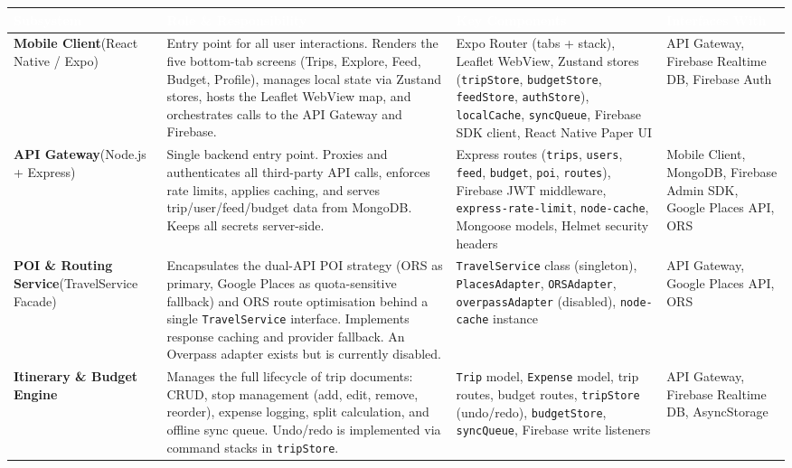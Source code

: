 \documentclass[12pt, a4paper]{article}
\newcommand{\thcell}[1]{\textcolor{white}{\textbf{\small #1}}}
\begin{document}
\begin{longtable}{L{3.0cm} L{4.8cm} L{3.8cm} L{2.2cm}}
\toprule
{}
\thcell{Subsystem} & \thcell{Role \& Responsibility} &
\thcell{Key Components} & \thcell{Interfaces With} \\
\midrule
\endhead
\bottomrule
\endfoot

\textbf{Mobile Client}\newline(React Native / Expo) &
Entry point for all user interactions. Renders the five bottom-tab screens (Trips, Explore, Feed, Budget, Profile), manages local state via Zustand stores, hosts the Leaflet WebView map, and orchestrates calls to the API Gateway and Firebase. &
Expo Router (tabs + stack), Leaflet WebView, Zustand stores (\texttt{tripStore}, \texttt{budgetStore}, \texttt{feedStore}, \texttt{authStore}), \texttt{localCache}, \texttt{syncQueue}, Firebase SDK client, React Native Paper UI &
API Gateway, Firebase Realtime DB, Firebase Auth \\

\textbf{API Gateway}\newline(Node.js + Express) &
Single backend entry point. Proxies and authenticates all third-party API calls, enforces rate limits, applies caching, and serves trip/user/feed/budget data from MongoDB. Keeps all secrets server-side. &
Express routes (\texttt{trips}, \texttt{users}, \texttt{feed}, \texttt{budget}, \texttt{poi}, \texttt{routes}), Firebase JWT middleware, \texttt{express-rate-limit}, \texttt{node-cache}, Mongoose models, Helmet security headers &
Mobile Client, MongoDB, Firebase Admin SDK, Google Places API, ORS \\

\textbf{POI \& Routing Service}\newline(TravelService Facade) &
Encapsulates the dual-API POI strategy (ORS as primary, Google Places as quota-sensitive fallback) and ORS route optimisation behind a single \texttt{TravelService} interface. Implements response caching and provider fallback. An Overpass adapter exists but is currently disabled. &
\texttt{TravelService} class (singleton), \texttt{PlacesAdapter}, \texttt{ORSAdapter}, \texttt{overpassAdapter} (disabled), \texttt{node-cache} instance &
API Gateway, Google Places API, ORS \\

\textbf{Itinerary \& Budget Engine} &
Manages the full lifecycle of trip documents: CRUD, stop management (add, edit, remove, reorder), expense logging, split calculation, and offline sync queue. Undo/redo is implemented via command stacks in \texttt{tripStore}. &
\texttt{Trip} model, \texttt{Expense} model, trip routes, budget routes, \texttt{tripStore} (undo/redo), \texttt{budgetStore}, \texttt{syncQueue}, Firebase write listeners &
API Gateway, Firebase Realtime DB, AsyncStorage \\


\end{longtable}
\end{document}
